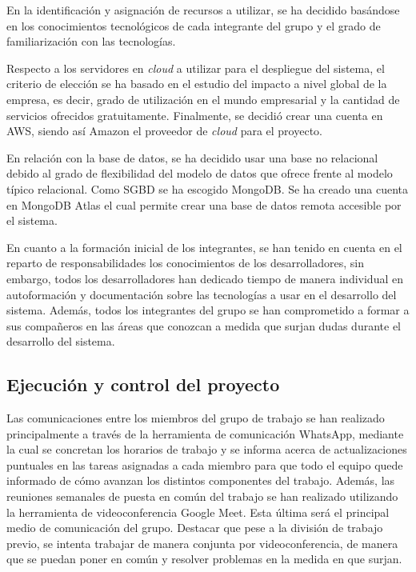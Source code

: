 \documentclass{article}
\begin{document}
En la identificación y asignación de recursos a utilizar, se ha decidido basándose en los conocimientos tecnológicos de cada integrante del grupo y el grado de familiarización con las tecnologías.

Respecto a los servidores en \textit{cloud} a utilizar para el despliegue del sistema, el criterio de elección se ha basado en el estudio del impacto a nivel global de la empresa, es decir, grado de utilización en el mundo empresarial y la cantidad de servicios ofrecidos gratuitamente. Finalmente, se decidió crear una cuenta en AWS, siendo así Amazon el proveedor de \textit{cloud} para el proyecto.

En relación con la base de datos, se ha decidido usar una base no relacional debido al grado de flexibilidad del modelo de datos que ofrece frente al modelo típico relacional. Como SGBD se ha escogido MongoDB. Se ha creado una cuenta en MongoDB Atlas el cual permite crear una base de datos remota accesible por el sistema.

En cuanto a la formación inicial de los integrantes, se han tenido en cuenta en el reparto de responsabilidades los conocimientos de los desarrolladores, sin embargo, todos los desarrolladores han dedicado tiempo de manera individual en autoformación y documentación sobre las tecnologías a usar en el desarrollo del sistema. Además, todos los integrantes del grupo se han comprometido a formar a sus compañeros en las áreas que conozcan a medida que surjan dudas durante el desarrollo del sistema.

\subsection{Ejecución y control del proyecto}

Las comunicaciones entre los miembros del grupo de trabajo se han realizado principalmente a través de la herramienta de comunicación WhatsApp, mediante la cual se concretan los horarios de trabajo y se informa acerca de actualizaciones puntuales en las tareas asignadas a cada miembro para que todo el equipo quede informado de cómo avanzan los distintos componentes del trabajo. Además, las reuniones semanales de puesta en común del trabajo se han realizado utilizando la herramienta de videoconferencia Google Meet. Esta última será el principal medio de comunicación del grupo. Destacar que pese a la división de trabajo previo, se intenta trabajar de manera conjunta por videoconferencia, de manera que se puedan poner en común y resolver problemas en la medida en que surjan.
\end{document}
